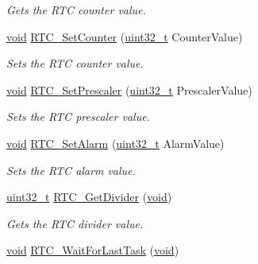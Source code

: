 \begin{DoxyCompactItemize}
\begin{DoxyCompactList}\small\item\em Gets the R\+TC counter value. \end{DoxyCompactList}\item 
\hyperlink{usb__devapi_8h_afabf60e7f57651d6d595a02c75f07cd0}{void} \hyperlink{group___r_t_c___private___functions_gafa81ec17158de1d1a7740eca81b9fb65}{R\+T\+C\+\_\+\+Set\+Counter} (\hyperlink{_p_e___types_8h_a33594304e786b158f3fb30289278f5af}{uint32\+\_\+t} Counter\+Value)
\begin{DoxyCompactList}\small\item\em Sets the R\+TC counter value. \end{DoxyCompactList}\item 
\hyperlink{usb__devapi_8h_afabf60e7f57651d6d595a02c75f07cd0}{void} \hyperlink{group___r_t_c___private___functions_gaf76be6071d1ba65b009e0791069e602c}{R\+T\+C\+\_\+\+Set\+Prescaler} (\hyperlink{_p_e___types_8h_a33594304e786b158f3fb30289278f5af}{uint32\+\_\+t} Prescaler\+Value)
\begin{DoxyCompactList}\small\item\em Sets the R\+TC prescaler value. \end{DoxyCompactList}\item 
\hyperlink{usb__devapi_8h_afabf60e7f57651d6d595a02c75f07cd0}{void} \hyperlink{group___r_t_c___private___functions_gaec644c636a30ab5e287ba60ffc77132c}{R\+T\+C\+\_\+\+Set\+Alarm} (\hyperlink{_p_e___types_8h_a33594304e786b158f3fb30289278f5af}{uint32\+\_\+t} Alarm\+Value)
\begin{DoxyCompactList}\small\item\em Sets the R\+TC alarm value. \end{DoxyCompactList}\item 
\hyperlink{_p_e___types_8h_a33594304e786b158f3fb30289278f5af}{uint32\+\_\+t} \hyperlink{group___r_t_c___private___functions_gaa4f00e0469fedcf6cbf23760e6d801ed}{R\+T\+C\+\_\+\+Get\+Divider} (\hyperlink{usb__devapi_8h_afabf60e7f57651d6d595a02c75f07cd0}{void})
\begin{DoxyCompactList}\small\item\em Gets the R\+TC divider value. \end{DoxyCompactList}\item 
\hyperlink{usb__devapi_8h_afabf60e7f57651d6d595a02c75f07cd0}{void} \hyperlink{group___r_t_c___private___functions_gaa0a406ef860d5231748c5f0d82673036}{R\+T\+C\+\_\+\+Wait\+For\+Last\+Task} (\hyperlink{usb__devapi_8h_afabf60e7f57651d6d595a02c75f07cd0}{void})

\end{DoxyCompactItemize}
